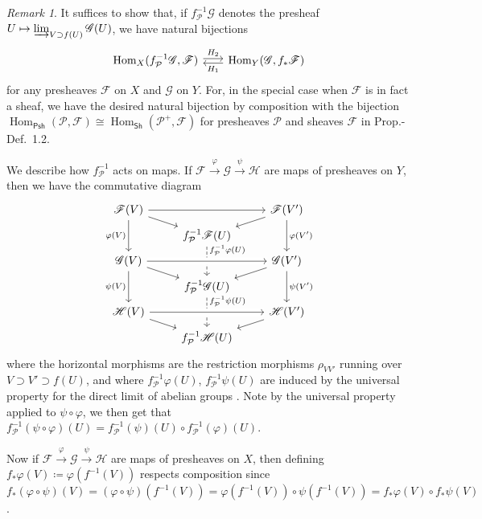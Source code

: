 \documentclass[12pt,letterpaper]{article}
\theoremstyle{definition}
\theoremstyle{remark}
\newtheorem*{remark}{Remark}
\numberwithin{equation}{section}
\numberwithin{figure}{problem}
\DeclareMathOperator{\Hom}{Hom}
\begin{document}
\begin{remark}
  It suffices to show that, if $f^{-1}_\mathcal{P}\mathscr{G}$ denotes the presheaf $U \mapsto \varinjlim_{V \supset f(U)} \mathscr{G}(U)$, we have natural bijections
  \begin{equation}\label{adjointeqs}
    \begin{tikzcd}[column sep=scriptsize]
      \Hom_X(f^{-1}_\mathcal{P}\mathscr{G},\mathscr{F}) \arrow[yshift=2pt]{r}{H_2} & \arrow[yshift=-2pt]{l}{H_1} \Hom_Y(\mathscr{G},f_*\mathscr{F})
    \end{tikzcd}
  \end{equation}
  for any presheaves $\mathscr{F}$ on $X$ and $\mathscr{G}$ on $Y$. For, in the special case when $\mathscr{F}$ is in fact a sheaf, we have the desired natural bijection by composition with the bijection $\Hom_{\mathsf{Psh}}(\mathcal{P},\mathscr{F}) \cong \Hom_{\mathsf{Sh}}(\mathcal{P}^+,\mathscr{F})$ for presheaves $\mathcal{P}$ and sheaves $\mathscr{F}$ in Prop.-Def.~1.2.
  \par We describe how $f^{-1}_\mathcal{P}$ acts on maps. If $\mathscr{F} \overset{\varphi}{\to} \mathscr{G} \overset{\psi}{\to} \mathscr{H}$ are maps of presheaves on $Y$, then we have the commutative diagram
  \begin{equation*}
    \begin{tikzcd}[row sep=tiny]
      \mathscr{F}(V) \arrow{rr} \arrow{dd}[swap]{\varphi(V)}\arrow{dr} & & \mathscr{F}(V') \arrow{dd}{\varphi(V')}\arrow{dl}\\
      & f_\mathcal{P}^{-1}\mathscr{F}(U)\arrow[dashed]{dd}[yshift=10pt]{f_\mathcal{P}^{-1}\varphi(U)}\\
      \mathscr{G}(V)\arrow{dd}[swap]{\psi(V)}\arrow{dr} \arrow[crossing over]{rr} & & \mathscr{G}(V')\arrow{dd}{\psi(V')}\arrow{dl}\\
      & f_\mathcal{P}^{-1} \mathscr{G}(U) \arrow[dashed]{dd}[yshift=10pt]{f_\mathcal{P}^{-1}\psi(U)}\\
      \mathscr{H}(V)\arrow[crossing over]{rr}\arrow{dr} & & \mathscr{H}(V')\arrow{dl}\\
      & f_\mathcal{P}^{-1} \mathscr{H}(U)
    \end{tikzcd}
  \end{equation*}
  where the horizontal morphisms are the restriction morphisms $\rho_{VV'}$ running over $V \supset V' \supset f(U)$, and where $f_\mathcal{P}^{-1}\varphi(U)$, $f_\mathcal{P}^{-1}\psi(U)$ are induced by the universal property for the direct limit of abelian groups \cite[III, Thm.~10.1]{Lan02}. Note by the universal property applied to $\psi \circ \varphi$, we then get that $f_\mathcal{P}^{-1}(\psi \circ \varphi)(U) = f_\mathcal{P}^{-1}(\psi)(U) \circ f_\mathcal{P}^{-1}(\varphi)(U)$.
  \par Now if $\mathscr{F} \overset{\varphi}{\to} \mathscr{G} \overset{\psi}{\to} \mathscr{H}$ are maps of presheaves on $X$, then defining $f_*\varphi(V) \coloneqq \varphi(f^{-1}(V))$ respects composition since $f_*(\varphi \circ \psi)(V) = (\varphi \circ \psi)(f^{-1}(V)) = \varphi(f^{-1}(V)) \circ \psi(f^{-1}(V)) = f_*\varphi(V) \circ f_*\psi(V)$.
\end{remark}
\end{document}
